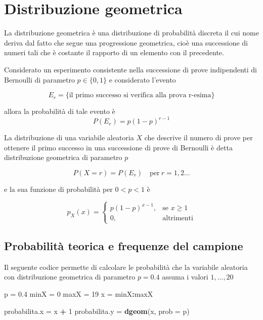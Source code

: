 \documentclass[]{book}
\newenvironment{Shaded}{\begin{snugshade}}{\end{snugshade}}
\newcommand{\KeywordTok}[1]{\textcolor[rgb]{0.13,0.29,0.53}{\textbf{#1}}}
\newcommand{\DataTypeTok}[1]{\textcolor[rgb]{0.13,0.29,0.53}{#1}}
\newcommand{\DecValTok}[1]{\textcolor[rgb]{0.00,0.00,0.81}{#1}}
\newcommand{\FloatTok}[1]{\textcolor[rgb]{0.00,0.00,0.81}{#1}}
\newcommand{\StringTok}[1]{\textcolor[rgb]{0.31,0.60,0.02}{#1}}
\newcommand{\OperatorTok}[1]{\textcolor[rgb]{0.81,0.36,0.00}{\textbf{#1}}}
\newcommand{\NormalTok}[1]{#1}
\begin{document}
\chapter{Distribuzione geometrica}\label{distribuzione-geometrica}

La distribuzione geometrica è una distribuzione di probabilità discreta
il cui nome deriva dal fatto che segue una progressione geometrica, cioè
una successione di numeri tali che è costante il rapporto di un elemento
con il precedente.

Considerato un esperimento consistente nella successione di prove
indipendenti di Bernoulli di parametro \(p \in \{0, 1\}\) e considerato
l'evento

\[E_r = \{ \text{il primo successo si verifica alla prova r-esima}\}\]

allora la probabilità di tale evento è \[P(E_r) = p(1-p)^{r-1}\]

La distribuzione di una variabile aleatoria \(X\) che descrive il numero
di prove per ottenere il primo successo in una successione di prove di
Bernoulli è detta distribuzione geometrica di parametro \(p\)

\[P(X = r) = P(E_r) \quad \text{per} \ r=1,2...\]

e la sua funzione di probabilità per \(0 < p < 1\) è

\[p_X(x) = \begin{cases} p(1-p)^{x-1}, & \mbox{se } x \ge 1 \\ 0, & \mbox{altrimenti} \end{cases}\]

\section{Probabilità teorica e frequenze del
campione}\label{probabilita-teorica-e-frequenze-del-campione}

Il seguente codice permette di calcolare le probabilità che la variabile
aleatoria con distribuzione geometrica di parametro \(p=0.4\) assuma i
valori \(1,...,20\)

\begin{Shaded}
\begin{Highlighting}[]
\NormalTok{p =}\StringTok{ }\FloatTok{0.4}
\NormalTok{minX =}\StringTok{ }\DecValTok{0}
\NormalTok{maxX =}\StringTok{ }\DecValTok{19}
\NormalTok{x =}\StringTok{ }\NormalTok{minX}\OperatorTok{:}\NormalTok{maxX}

\NormalTok{probabilita.x =}\StringTok{ }\NormalTok{x }\OperatorTok{+}\StringTok{ }\DecValTok{1}
\NormalTok{probabilita.y =}\StringTok{ }\KeywordTok{dgeom}\NormalTok{(x, }\DataTypeTok{prob =}\NormalTok{ p)}
\end{Highlighting}
\end{Shaded}
\end{document}
